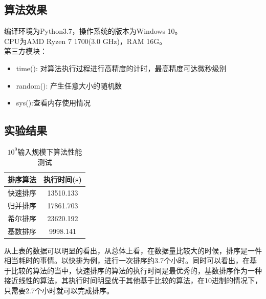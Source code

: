 \documentclass[UTF8]{ctexart}
\begin{document}
\subsection{算法效果}
编译环境为Python3.7，操作系统的版本为Windows 10。\\
CPU为AMD Ryzen 7 1700(3.0 GHz)，RAM 16G。\\
第三方模块：
\begin{itemize}
\item time(): 对算法执行过程进行高精度的计时，最高精度可达微秒级别
\item random(): 产生任意大小的随机数
\item sys():查看内存使用情况
\end{itemize}

\subsection{实验结果}


\begin{table}[H]
    \caption{$10^9$输入规模下算法性能测试}
    \label{table-1}
    \begin{center}
        \begin{tabular}{cc}
            \hline
            排序算法&   执行时间(s)\\     
            \hline
            快速排序&       13510.133\\               
            归并排序&       17861.703\\              
            希尔排序&       23620.192\\             
            基数排序&      9998.141\\                      
            \hline
        \end{tabular}  
    \end{center}
\end{table}

从上表的数据可以明显的看出，从总体上看，在数据量比较大的时候，排序是一件相当耗时的事情。以快排为例，进行一次排序约3.7个小时。同时可以看出，在基于比较的算法的当中，快速排序的算法的执行时间是最优秀的，基数排序作为一种接近线性的算法，其执行时间明显优于其他基于比较的算法，在10进制的情况下，只需要2.7个小时就可以完成排序。
\end{document}
